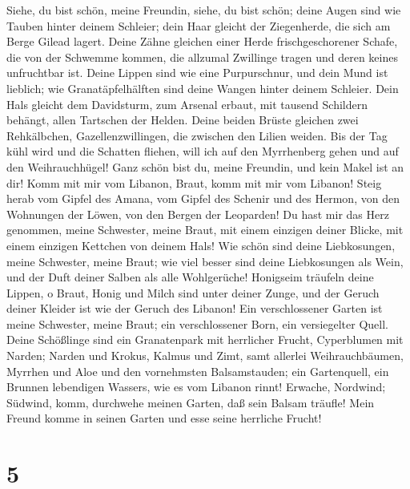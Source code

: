  Siehe, du bist schön, meine Freundin, siehe, du bist
schön; deine Augen sind wie Tauben hinter deinem Schleier; dein Haar
gleicht der Ziegenherde, die sich am Berge Gilead lagert. 
Deine Zähne gleichen einer Herde frischgeschorener Schafe, die von der
Schwemme kommen, die allzumal Zwillinge tragen und deren keines
unfruchtbar ist.  Deine Lippen sind wie eine Purpurschnur,
und dein Mund ist lieblich; wie Granatäpfelhälften sind deine Wangen
hinter deinem Schleier.  Dein Hals gleicht dem Davidsturm,
zum Arsenal erbaut, mit tausend Schildern behängt, allen Tartschen der
Helden.  Deine beiden Brüste gleichen zwei Rehkälbchen,
Gazellenzwillingen, die zwischen den Lilien weiden.  Bis
der Tag kühl wird und die Schatten fliehen, will ich auf den Myrrhenberg
gehen und auf den Weihrauchhügel!  Ganz schön bist du,
meine Freundin, und kein Makel ist an dir!  Komm mit mir
vom Libanon, Braut, komm mit mir vom Libanon! Steig herab vom Gipfel des
Amana, vom Gipfel des Schenir und des Hermon, von den Wohnungen der
Löwen, von den Bergen der Leoparden!  Du hast mir das Herz
genommen, meine Schwester, meine Braut, mit einem einzigen deiner
Blicke, mit einem einzigen Kettchen von deinem Hals!  Wie
schön sind deine Liebkosungen, meine Schwester, meine Braut; wie viel
besser sind deine Liebkosungen als Wein, und der Duft deiner Salben als
alle Wohlgerüche!  Honigseim träufeln deine Lippen, o
Braut, Honig und Milch sind unter deiner Zunge, und der Geruch deiner
Kleider ist wie der Geruch des Libanon!  Ein
verschlossener Garten ist meine Schwester, meine Braut; ein
verschlossener Born, ein versiegelter Quell.  Deine
Schößlinge sind ein Granatenpark mit herrlicher Frucht, Cyperblumen mit
Narden;  Narden und Krokus, Kalmus und Zimt, samt
allerlei Weihrauchbäumen, Myrrhen und Aloe und den vornehmsten
Balsamstauden;  ein Gartenquell, ein Brunnen lebendigen
Wassers, wie es vom Libanon rinnt!  Erwache, Nordwind;
Südwind, komm, durchwehe meinen Garten, daß sein Balsam träufle! Mein
Freund komme in seinen Garten und esse seine herrliche Frucht!

\hypertarget{section-4}{%
\section{5}\label{section-4}}

